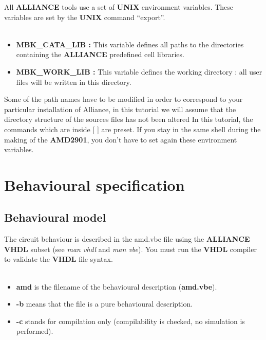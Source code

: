 \documentclass[11pt,a4]{article}
\begin{document}
All {\bf ALLIANCE} tools use a set of {\bf UNIX} environment variables.
These variables are set by the {\bf UNIX} command ``export''.\\
\\

\begin{itemize}
\item{\bf MBK\_CATA\_LIB :} This variable defines all paths to the directories
containing the {\bf ALLIANCE} predefined cell libraries.
\item{\bf MBK\_WORK\_LIB :} This variable defines the working directory : 
all user files will be written in this directory.
\end{itemize}
Some of the path names have to be modified in order to correspond to your particular installation of Alliance, in this tutorial we will assume that the directory structure of the sources files has not been altered
In this tutorial, the commands which are inside [ ] are preset. 
If you stay in  the same shell during the making of the {\bf AMD2901},
 you don't have to set again these environment variables.

\section{Behavioural specification}

\subsection{Behavioural model}

The circuit behaviour is described in the amd.vbe file using the 
{\bf ALLIANCE VHDL} subset (see {\it man vhdl} and {\it man vbe}).
You must run the {\bf VHDL} compiler to validate the {\bf VHDL}
file syntax.\\
\\
\begin{itemize}
\item {\bf amd} is the filename of the behavioural description ({\bf amd.vbe}).
\item {\bf -b} means that the file is a pure behavioural description.
\item {\bf -c} stands for compilation only (compilability is checked, 
no simulation is performed).
\end{itemize}
\end{document}
